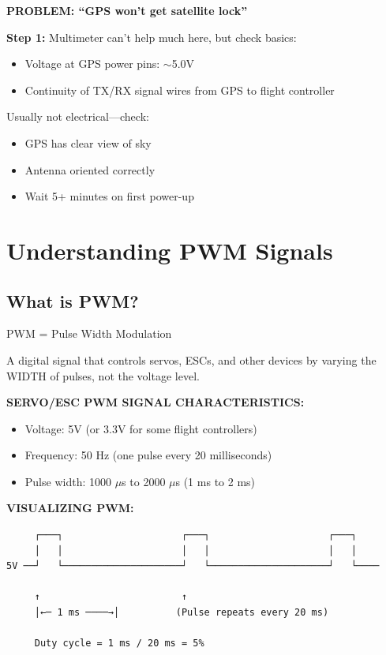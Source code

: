 \documentclass[11pt,letterpaper]{article}
\begin{document}
\vspace{1em}

\textbf{PROBLEM: ``GPS won't get satellite lock''}

\textbf{Step 1:} Multimeter can't help much here, but check basics:
\begin{itemize}[nosep]
\item Voltage at GPS power pins: $\sim$5.0V
\item Continuity of TX/RX signal wires from GPS to flight controller
\end{itemize}

Usually not electrical—check:
\begin{itemize}[nosep]
\item GPS has clear view of sky
\item Antenna oriented correctly
\item Wait 5+ minutes on first power-up
\end{itemize}

\newpage
\section{Understanding PWM Signals}

\subsection{What is PWM?}

PWM = Pulse Width Modulation

A digital signal that controls servos, ESCs, and other devices by varying the WIDTH of pulses, not the voltage level.

\textbf{SERVO/ESC PWM SIGNAL CHARACTERISTICS:}
\begin{itemize}
\item Voltage: 5V (or 3.3V for some flight controllers)
\item Frequency: 50 Hz (one pulse every 20 milliseconds)
\item Pulse width: 1000 $\mu$s to 2000 $\mu$s (1 ms to 2 ms)
\end{itemize}

\textbf{VISUALIZING PWM:}

\begin{verbatim}
     ┌───┐                     ┌───┐                     ┌───┐
     │   │                     │   │                     │   │
5V ──┘   └─────────────────────┘   └─────────────────────┘   └────

     ↑                         ↑
     │←─ 1 ms ────→│          (Pulse repeats every 20 ms)
     
     Duty cycle = 1 ms / 20 ms = 5%
\end{verbatim}
\end{document}
